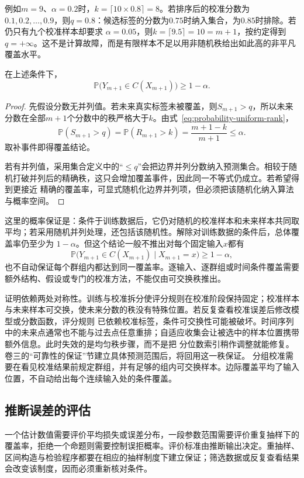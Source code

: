 例如\(m=9\)、\(\alpha=0.2\)时，\(k=\lceil10\times0.8\rceil=8\)。若排序后的校准分数为
\(0.1,0.2,\ldots,0.9\)，则\(q=0.8\)：候选标签的分数为\(0.75\)时纳入集合，为\(0.85\)时排除。若仍只有九个校准样本却要求
\(\alpha=0.05\)，则\(k=\lceil9.5\rceil=10=m+1\)，按约定得到\(q=+\infty\)。这不是计算故障，而是有限样本不足以用非随机秩给出如此高的非平凡覆盖水平。

\begin{theorem}[拆分共形的有限样本覆盖]
\label{thm:probability-split-conformal-coverage}
在上述条件下，
\[ \mathbb{P}\bigl(
    Y_{m+1}\in C(X_{m+1})\bigr)\geq 1-\alpha. \]
\end{theorem}

\begin{proof}
先假设分数无并列值。若未来真实标签未被覆盖，则\(S_{m+1}>q\)，所以未来分数在全部\(m+1\)个分数中的秩严格大于\(k\)。由式~\eqref{eq:probability-uniform-rank}，
\[ \mathbb{P}(S_{m+1}>q)
  =\mathbb{P}(R_{m+1}>k)=\frac{m+1-k}{m+1}\leq\alpha. \]
取补事件即得覆盖结论。

若有并列值，采用集合定义中的“\(\leq q\)”会把边界并列分数纳入预测集合。相较于随机打破并列后的精确秩，这只会增加覆盖事件，因此同一不等式仍成立。若希望得到更接近
精确的覆盖率，可显式随机化边界并列项，但必须把该随机化纳入算法与概率空间。
\end{proof}

这里的概率保证是：条件于训练数据后，它仍对随机的校准样本和未来样本共同取平均；若采用随机并列处理，还包括该随机性。解除对训练数据的条件后，总体覆盖率仍至少为
\(1-\alpha\)。但这个结论一般不推出对每个固定输入\(x\)都有
\[
  \mathbb{P}\bigl(
    Y_{m+1}\in C(X_{m+1})
    \mid X_{m+1}=x
  \bigr)
  \geq1-\alpha,
\]
也不自动保证每个群组内都达到同一覆盖率。逐输入、逐群组或时间条件覆盖需要额外结构、假设或专门的校准方法，不能仅由可交换秩推出。

证明依赖两处对称性。训练与校准拆分使评分规则在校准阶段保持固定；校准样本与未来样本可交换，使未来分数的秩没有特殊位置。若反复查看校准误差后修改模型或分数函数，评分规则
已依赖校准标签，条件可交换性可能被破坏。时间序列中的未来点通常也不能与过去点任意重排；自适应收集会让被选中的样本位置携带额外信息。此时失效的是均匀秩步骤，而不是把
分位数索引稍作调整就能修复。
{卷三的“可靠性的保证”节}建立具体预测范围后，将回用这一秩保证。
分组校准需要在看见校准结果前规定群组，并有足够的组内可交换样本。边际覆盖平均了输入位置，不自动给出每个连续输入处的条件覆盖。

\subsection{推断误差的评估}
\label{sec:stats-uncertainty-testing-selection}
一个估计数值需要评价平均损失或误差分布，一段参数范围需要评价重复抽样下的覆盖率，拒绝一个命题则需要控制误拒概率。评价标准由推断输出决定。重抽样、区间构造与检验程序都要在相应的抽样制度下建立保证；筛选数据或反复查看结果会改变该制度，因而必须重新核对条件。

